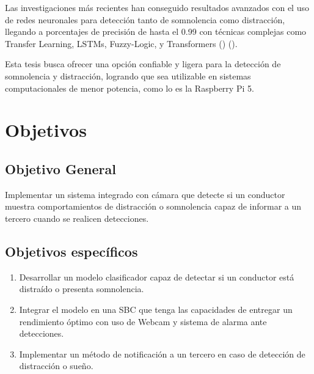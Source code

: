 Las investigaciones más recientes han conseguido resultados avanzados con el uso de redes neuronales para detección tanto de somnolencia como distracción, llegando a porcentajes de precisión de hasta el 0.99 con técnicas complejas como Transfer Learning, LSTMs, Fuzzy-Logic, y Transformers (\cite{ModelosDist}) (\cite{sysrev}).

Esta tesis busca ofrecer una opción confiable y ligera para la detección de somnolencia y distracción, logrando que sea utilizable en sistemas computacionales de menor potencia, como lo es la Raspberry Pi 5.
\section{Objetivos}
\subsection{Objetivo General}
Implementar un sistema integrado con cámara que detecte si un conductor muestra comportamientos de distracción o somnolencia capaz de informar a un tercero cuando se realicen detecciones.

\subsection{Objetivos específicos}
\begin{enumerate}
    \item Desarrollar un modelo clasificador capaz de detectar si un conductor está distraído o presenta somnolencia.

    \item Integrar el modelo en una SBC que tenga las capacidades de entregar un rendimiento óptimo con uso de Webcam y sistema de alarma ante detecciones.

    \item Implementar un método de notificación a un tercero en caso de detección de distracción o sueño.
\end{enumerate}

  
